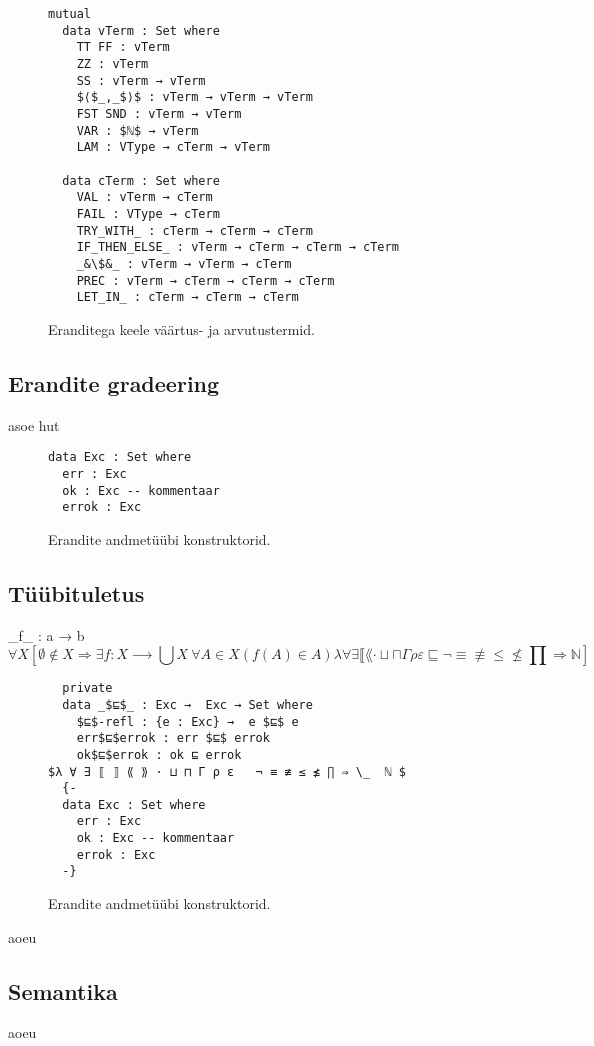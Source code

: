 \documentclass[a4paper,12pt]{article}
\begin{document}
\begin{figure}
  \begin{lstlisting}
mutual
  data vTerm : Set where
    TT FF : vTerm
    ZZ : vTerm
    SS : vTerm → vTerm
    $⟨$_,_$⟩$ : vTerm → vTerm → vTerm
    FST SND : vTerm → vTerm
    VAR : $ℕ$ → vTerm
    LAM : VType → cTerm → vTerm

  data cTerm : Set where
    VAL : vTerm → cTerm
    FAIL : VType → cTerm
    TRY_WITH_ : cTerm → cTerm → cTerm
    IF_THEN_ELSE_ : vTerm → cTerm → cTerm → cTerm
    _&\$&_ : vTerm → vTerm → cTerm
    PREC : vTerm → cTerm → cTerm → cTerm
    LET_IN_ : cTerm → cTerm → cTerm

  \end{lstlisting}
  \caption{Eranditega keele väärtus- ja arvutustermid.}
  \label{fig:exc.raw}
\end{figure}


\subsection{Erandite gradeering}
asoe hut

\begin{figure}
  \begin{lstlisting}
data Exc : Set where
  err : Exc
  ok : Exc -- kommentaar
  errok : Exc

  \end{lstlisting}
  \caption{Erandite andmetüübi konstruktorid.}
\end{figure}

\subsection{Tüübituletus}
_f_ : a → b\[
∀X [ ∅ ∉ X ⇒ ∃f:X ⟶  ⋃ X\ ∀A ∈ X (f(A) ∈ A )λ ∀ ∃ ⟦ ⟪ · ⊔ ⊓ Γ ρ ε  ⊑   ¬ ≡ ≢ ≤ ≰ ∏ ⇒  ℕ ]\]
\begin{figure}
  \begin{lstlisting}
  private
  data _$⊑$_ : Exc →  Exc → Set where
    $⊑$-refl : {e : Exc} →  e $⊑$ e
    err$⊑$errok : err $⊑$ errok
    ok$⊑$errok : ok ⊑ errok
$λ ∀ ∃ ⟦ ⟧ ⟪ ⟫ · ⊔ ⊓ Γ ρ ε   ¬ ≡ ≢ ≤ ≰ ∏ ⇒ \_  ℕ $
  {-
  data Exc : Set where
    err : Exc
    ok : Exc -- kommentaar 
    errok : Exc
  -}
  \end{lstlisting}
  \caption{Erandite andmetüübi konstruktorid.}
\end{figure}

aoeu
\subsection{Semantika}
aoeu
\end{document}
